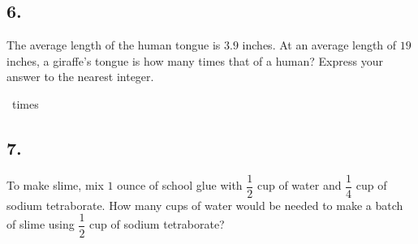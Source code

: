\documentclass[12pt]{article}
\begin{document}
\begin{answer}
%
\end{answer}


\subsection*{6.}
The average length of the human tongue is $3.9$ inches. At an average length of $19$ inches, a giraffe's tongue is how many times that of a human? Express your answer to the nearest integer. 

\nopagebreak

\fbox{\phantom{ANSWER}}~times

\begin{answer}
%
\end{answer}


\subsection*{7.}
To make slime, mix $1$ ounce of school glue with $\dfrac{1}{2}$ cup of water and $\dfrac{1}{4}$ cup of sodium tetraborate. How many cups of water would be needed to make a batch of slime using $\dfrac{1}{2}$ cup of sodium tetraborate? 
\end{document}
